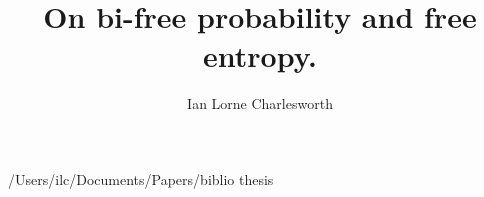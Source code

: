 \documentclass [PhD] {uclathes}
\title          {On bi-free probability and free entropy.}
\author         {Ian Lorne Charlesworth}
\begin{document}
\makeintropages








 
 {/Users/ilc/Documents/Papers/biblio}
 {thesis}
\end{document}
